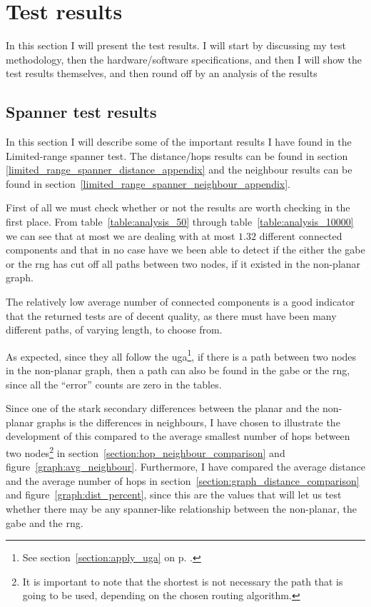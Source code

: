 \section{Test results}
\label{section:test_results}
In this section I will present the test results. I will start by discussing my test methodology, then the hardware/software specifications, and then I will show the test results themselves, and then round off by an analysis of the results 

\subsection{Spanner test results}
In this section I will  describe some of the important results I have found in the Limited-range spanner test. The distance/hops results can be found in section \ref{limited_range_spanner_distance_appendix} and the neighbour results can be found in section~\ref{limited_range_spanner_neighbour_appendix}.

First of all we must check whether or not the results are worth checking in the first place. From table~\ref{table:analysis_50} through table~\ref{table:analysis_10000} we can see that at most we are dealing with at most $1.32$ different connected components and that in no case have we been able to detect if the either the \ac{gabe} or the \ac{rng} has cut off all paths between two nodes, if it existed in the non-planar graph. 

The relatively low average number of connected components is a good indicator that the returned tests are of decent quality, as there must have been many different paths, of varying length, to choose from.

As expected, since they all follow the \ac{uga}\footnote{See section~\ref{section:apply_uga} on p. \pageref{section:apply_uga}.}, if there is a path between two nodes in the non-planar graph, then a path can also be found in the \ac{gabe} or the \ac{rng}, since all the ``error'' counts are zero in the tables.

Since one of the stark secondary differences between the planar and the non-planar graphs is the differences in neighbours, I have chosen to illustrate the development of this compared to the average smallest number of hops between two nodes\footnote{It is important to note that the shortest is not necessary the path that is going to be used, depending on the chosen routing algorithm.} in section~\ref{section:hop_neighbour_comparison} and figure~\ref{graph:avg_neighbour}. Furthermore, I have compared the average distance and the average number of hops in section~\ref{section:graph_distance_comparison} and figure~\ref{graph:dist_percent}, since this are the values that will let us test whether there may be any spanner-like relationship between the non-planar, the \ac{gabe} and the \ac{rng}.

